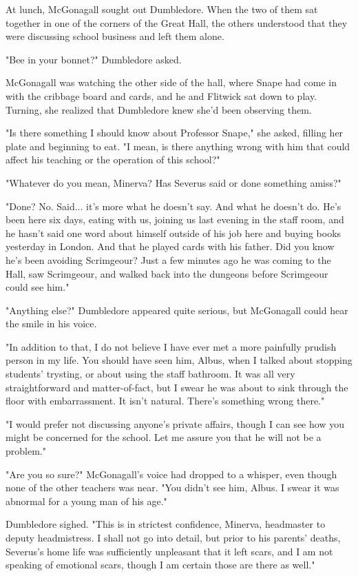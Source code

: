 At lunch, McGonagall sought out Dumbledore. When the two of them sat together in one of the corners of the Great Hall, the others understood that they were discussing school business and left them alone.

"Bee in your bonnet?" Dumbledore asked.

McGonagall was watching the other side of the hall, where Snape had come in with the cribbage board and cards, and he and Flitwick sat down to play. Turning, she realized that Dumbledore knew she'd been observing them.

"Is there something I should know about Professor Snape," she asked, filling her plate and beginning to eat. "I mean, is there anything wrong with him that could affect his teaching or the operation of this school?"

"Whatever do you mean, Minerva? Has Severus said or done something amiss?"

"Done? No. Said... it's more what he doesn't say. And what he doesn't do. He's been here six days, eating with us, joining us last evening in the staff room, and he hasn't said one word about himself outside of his job here and buying books yesterday in London. And that he played cards with his father. Did you know he's been avoiding Scrimgeour? Just a few minutes ago he was coming to the Hall, saw Scrimgeour, and walked back into the dungeons before Scrimgeour could see him."

"Anything else?" Dumbledore appeared quite serious, but McGonagall could hear the smile in his voice.

"In addition to that, I do not believe I have ever met a more painfully prudish person in my life. You should have seen him, Albus, when I talked about stopping students' trysting, or about using the staff bathroom. It was all very straightforward and matter-of-fact, but I swear he was about to sink through the floor with embarrassment. It isn't natural. There's something wrong there."

"I would prefer not discussing anyone's private affairs, though I can see how you might be concerned for the school. Let me assure you that he will not be a problem."

"Are you so sure?" McGonagall's voice had dropped to a whisper, even though none of the other teachers was near. "You didn't see him, Albus. I swear it was abnormal for a young man of his age."

Dumbledore sighed. "This is in strictest confidence, Minerva, headmaster to deputy headmistress. I shall not go into detail, but prior to his parents' deaths, Severus's home life was sufficiently unpleasant that it left scars, and I am not speaking of emotional scars, though I am certain those are there as well."

